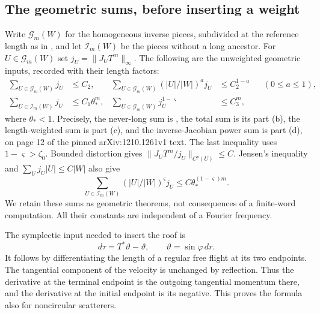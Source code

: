 \subsection{The geometric sums, before inserting a weight}
Write $\mathcal G_m(W)$ for the homogeneous inverse pieces, subdivided
at the reference length as in \cite[Section 3.2]{DZ}, and let
$\mathcal I_m(W)$ be the pieces without a long ancestor. For
$U\in\mathcal G_m(W)$ set
$j_U=\|J_UT^m\|_\infty$. The following are the unweighted geometric
inputs, recorded with their length factors:
\begin{align}
 \sum_{U\in\mathcal G_m(W)}j_U&\le C_2,&
 \sum_{U\in\mathcal G_m(W)}
                 (|U|/|W|)^a j_U&\le C_2^{1-a}
                   &&(0\le a\le1),                 \label{eq:v35-geometric-sums-a}\\
 \sum_{U\in\mathcal I_m(W)}j_U&\le C_1\theta_*^m,&
 \sum_{U\in\mathcal G_m(W)}j_U^{1-\varsigma}&\le C_3^m,
                                                        \label{eq:v35-geometric-sums-b}
\end{align}
where $\theta_*<1$. Precisely, the never-long sum is \cite[Lemma 3.2(a)]{DZ}, the total
sum is its part (b), the length-weighted sum is part (c), and the
inverse-Jacobian power sum is part (d), on page 12 of the pinned
arXiv:1210.1261v1 text. The
last inequality uses $1-\varsigma>\zeta_0$. Bounded distortion gives
$\|J_UT^m/j_U\|_{C^p(U)}\le C$. Jensen's inequality and
$\sum_U j_U|U|\le C|W|$ also give
\begin{equation}\label{eq:v35-never-long-length-sum}
 \sum_{U\in\mathcal I_m(W)}(|U|/|W|)^{\varsigma}j_U
                         \le C\theta_*^{(1-\varsigma)m}.
\end{equation}
We retain these sums as geometric theorems, not consequences of a
finite-word computation. All their constants are independent of a
Fourier frequency.

The symplectic input needed to insert the roof is
\begin{equation}\label{eq:v35-action-general}
 d\tau=T^*\vartheta-\vartheta,\qquad \vartheta=\sin\varphi\,dr.
\end{equation}
It follows by differentiating the length of a regular free flight at
its two endpoints. The tangential component of the velocity is unchanged
by reflection. Thus the derivative at the terminal endpoint is the
outgoing tangential momentum there, and the derivative at the initial
endpoint is its negative. This proves the formula also for noncircular
scatterers.

